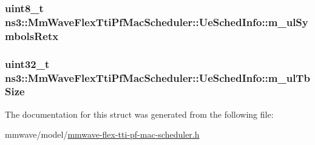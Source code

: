 \subsubsection[{\texorpdfstring{m\+\_\+ul\+Symbols\+Retx}{m_ulSymbolsRetx}}]{\setlength{\rightskip}{0pt plus 5cm}uint8\+\_\+t ns3\+::\+Mm\+Wave\+Flex\+Tti\+Pf\+Mac\+Scheduler\+::\+Ue\+Sched\+Info\+::m\+\_\+ul\+Symbols\+Retx}\hypertarget{structns3_1_1MmWaveFlexTtiPfMacScheduler_1_1UeSchedInfo_aee49cdf9c410bc073b72ca52faf693ff}{}\label{structns3_1_1MmWaveFlexTtiPfMacScheduler_1_1UeSchedInfo_aee49cdf9c410bc073b72ca52faf693ff}
\subsubsection[{\texorpdfstring{m\+\_\+ul\+Tb\+Size}{m_ulTbSize}}]{\setlength{\rightskip}{0pt plus 5cm}uint32\+\_\+t ns3\+::\+Mm\+Wave\+Flex\+Tti\+Pf\+Mac\+Scheduler\+::\+Ue\+Sched\+Info\+::m\+\_\+ul\+Tb\+Size}\hypertarget{structns3_1_1MmWaveFlexTtiPfMacScheduler_1_1UeSchedInfo_a7fc19a598d4cc51f6f8f8879df5d43d8}{}\label{structns3_1_1MmWaveFlexTtiPfMacScheduler_1_1UeSchedInfo_a7fc19a598d4cc51f6f8f8879df5d43d8}


The documentation for this struct was generated from the following file\+:\begin{DoxyCompactItemize}
\item 
mmwave/model/\hyperlink{mmwave-flex-tti-pf-mac-scheduler_8h}{mmwave-\/flex-\/tti-\/pf-\/mac-\/scheduler.\+h}\end{DoxyCompactItemize}
